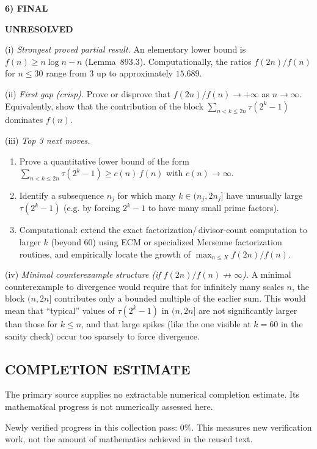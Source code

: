 \medskip
\noindent\textbf{6) FINAL}

\textbf{UNRESOLVED}

(i) \emph{Strongest proved partial result.}
An elementary lower bound is $f(n)\ge n\log n - n$ (Lemma~893.3).
Computationally, the ratios $f(2n)/f(n)$ for $n\le 30$ range from $3$ up to
approximately $15.689$.

(ii) \emph{First gap (crisp).}
Prove or disprove that $f(2n)/f(n)\to +\infty$ as $n\to\infty$.
Equivalently, show that the contribution of the block $\sum_{n<k\le 2n}\tau(2^k-1)$
dominates $f(n)$.

(iii) \emph{Top 3 next moves.}
\begin{enumerate}
\item Prove a quantitative lower bound of the form
$\sum_{n<k\le 2n}\tau(2^k-1) \ge c(n)\, f(n)$ with $c(n)\to\infty$.
\item Identify a subsequence $n_j$ for which many $k\in(n_j,2n_j]$ have unusually
large $\tau(2^k-1)$ (e.g. by forcing $2^k-1$ to have many small prime factors).
\item Computational: extend the exact factorization/\,divisor-count computation to
larger $k$ (beyond 60) using ECM or specialized Mersenne factorization routines,
and empirically locate the growth of $\max_{n\le X} f(2n)/f(n)$.
\end{enumerate}

(iv) \emph{Minimal counterexample structure (if $f(2n)/f(n)\not\to\infty$).}
A minimal counterexample to divergence would require that for infinitely many
scales $n$, the block $(n,2n]$ contributes only a bounded multiple of the earlier
sum. This would mean that “typical” values of $\tau(2^k-1)$ in $(n,2n]$ are not
significantly larger than those for $k\le n$, and that large spikes (like the one
visible at $k=60$ in the sanity check) occur too sparsely to force divergence.




\subsection*{COMPLETION ESTIMATE}
The primary source supplies no extractable numerical completion estimate. Its mathematical progress is not numerically assessed here.

Newly verified progress in this collection pass: $0\%$. This measures new verification work, not the amount of mathematics achieved in the reused text.
